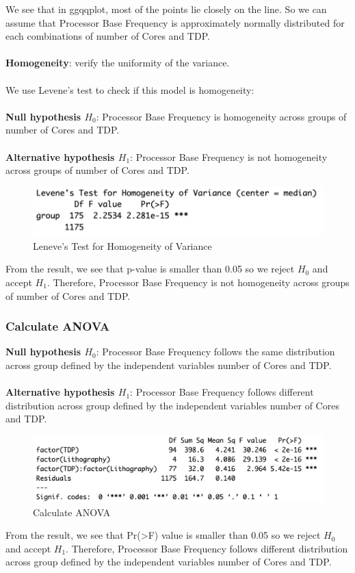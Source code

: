 We see that in ggqqplot, most of the points lie closely on the line. So we can assume that Processor Base Frequency is approximately normally distributed for each combinations of number of Cores and TDP.\\
\\
\textbf{Homogeneity}: verify the uniformity of the variance.\\
\\
We use Levene's test to check if this model is homogeneity:\\
\\
\textbf{Null hypothesis $H_0$}: Processor Base Frequency is homogeneity across groups of number of Cores and TDP.\\
\\
\textbf{Alternative hypothesis $H_1$}: Processor Base Frequency is not homogeneity across groups of number of Cores and TDP.
\begin{figure}[H]
    \centering
    \includegraphics[width=1\textwidth]{graphics/check_homogeneity.png}
    \caption{Leneve's Test for Homogeneity of Variance}
\end{figure}
From the result, we see that p-value is smaller than 0.05 so we reject $H_0$ and accept $H_1$. Therefore, Processor Base Frequency is not homogeneity across groups of number of Cores and TDP. 
\subsubsection{Calculate ANOVA}
\textbf{Null hypothesis $H_0$}: Processor Base Frequency follows the same distribution across group defined by the independent variables number of Cores and TDP.\\
\\
\textbf{Alternative hypothesis $H_1$}: Processor Base Frequency follows different distribution across group defined by the independent variables number of Cores and TDP.
\begin{figure}[H]
    \centering
    \includegraphics[width=1\textwidth]{graphics/anova_test.png}
    \caption{Calculate ANOVA}
\end{figure}
From the result, we see that Pr(>F) value is smaller than 0.05 so we reject $H_0$ and accept $H_1$. Therefore, Processor Base Frequency follows different distribution across group defined by the independent variables number of Cores and TDP.

